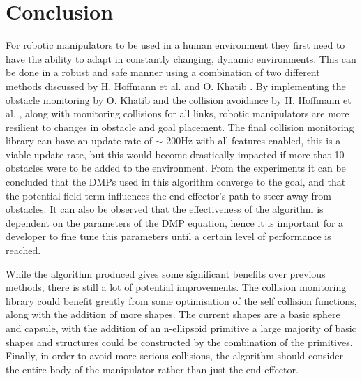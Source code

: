\documentclass[a4paper, 11.5pt, conference]{ieeeconf}      %
\begin{document}
\section{Conclusion}
For robotic manipulators to be used in a human environment they first need to have the ability to adapt in constantly changing, dynamic environments. This can be done in a robust and safe manner using a combination of two different methods discussed by H. Hoffmann et al. \cite{Hoffmann} and O. Khatib \cite{Khatib}. By implementing the obstacle monitoring by O. Khatib \cite{Khatib} and the collision avoidance by H. Hoffmann et al. \cite{Hoffmann}, along with monitoring collisions for all links, robotic manipulators are more resilient to changes in obstacle and goal placement. The final collision monitoring library can have an update rate of $\sim$ 200Hz with all features enabled, this is a viable update rate, but this would become drastically impacted if more that 10 obstacles were to be added to the environment. %
From the experiments it can be concluded that the DMPs used in this algorithm converge to the goal, and that the potential field term influences the end effector's path to steer away from obstacles. 
It can also be observed that the effectiveness of the algorithm is dependent on the parameters of the DMP equation, hence it is important for a developer to fine tune this parameters until a certain level of performance is reached.
 
While the algorithm produced gives some significant benefits over previous methods, there is still a lot of potential improvements. The collision monitoring library could benefit greatly from some optimisation of the self collision functions, along with the addition of more shapes. The current shapes are a basic sphere and capsule, with the addition of an n-ellipsoid primitive a large majority of basic shapes and structures could be constructed by the combination of the primitives. %
Finally, in order to avoid more serious collisions, the algorithm should consider the entire body of the manipulator rather than just the end effector. 



\addtolength{\textheight}{-12cm}   %
\end{document}
